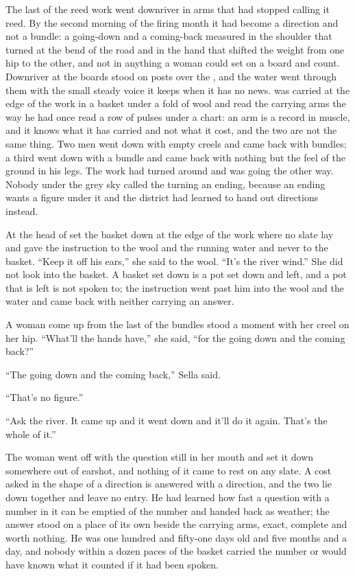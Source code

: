 
The last of the reed work went downriver in arms that had stopped calling it reed. By the second morning of the firing month it had become a direction and not a bundle: a going-down and a coming-back measured in the shoulder that turned at the bend of the road and in the hand that shifted the weight from one hip to the other, and not in anything a woman could set on a board and count. Downriver at  the boards stood on posts over the , and the water went through them with the small steady voice it keeps when it has no news.  was carried at the edge of the work in a basket under a fold of wool and read the carrying arms the way he had once read a row of pulses under a chart: an arm is a record in muscle, and it knows what it has carried and not what it cost, and the two are not the same thing. Two men went down with empty creels and came back with bundles; a third went down with a bundle and came back with nothing but the feel of the ground in his legs. The work had turned around and was going the other way. Nobody under the grey sky called the turning an ending, because an ending wants a figure under it and the district had learned to hand out directions instead.

At the head of   set the basket down at the edge of the work where no slate lay and gave the instruction to the wool and the running water and never to the basket. “Keep it off his ears,” she said to the wool. “It's the river wind.” She did not look into the basket. A basket set down is a pot set down and left, and a pot that is left is not spoken to; the instruction went past him into the wool and the water and came back with neither carrying an answer.

A woman come up from the last of the bundles stood a moment with her creel on her hip. “What'll the hands have,” she said, “for the going down and the coming back?”

“The going down and the coming back,” Sella said.

“That's no figure.”

“Ask the river. It came up and it went down and it'll do it again. That's the whole of it.”

The woman went off with the question still in her mouth and set it down somewhere out of earshot, and nothing of it came to rest on any slate. A cost asked in the shape of a direction is answered with a direction, and the two lie down together and leave no entry. He had learned how fast a question with a number in it can be emptied of the number and handed back as weather; the answer stood on a place of its own beside the carrying arms, exact, complete and worth nothing. He was one hundred and fifty-one days old and five months and a day, and nobody within a dozen paces of the basket carried the number or would have known what it counted if it had been spoken.

